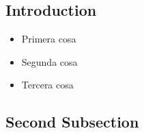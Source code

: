 
\subsection{Introduction}

\begin{itemize}
\item Primera cosa
\item Segunda cosa
\item Tercera cosa
\end{itemize}

\subsection{Second Subsection}